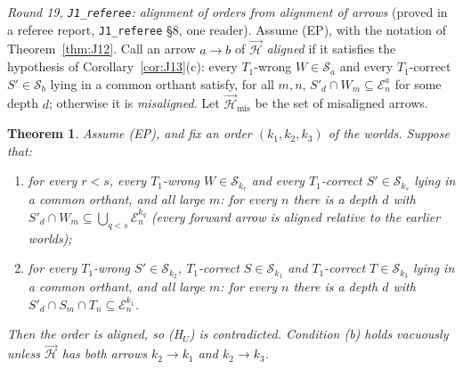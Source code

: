 \documentclass[11pt]{article}
\newtheorem{theorem}{Theorem}[section]
\theoremstyle{definition}
\theoremstyle{remark}
\newcommand{\src}[1]{\texttt{#1}}
\begin{document}
\emph{Round 19, \src{J1\_referee}: alignment of orders from alignment of arrows} (proved in a referee report, \src{J1\_referee} \S8, one reader). Assume (EP), with the notation of Theorem~\ref{thm:J12}. Call an arrow $a\to b$ of $\vec{\mathcal H}$ \emph{aligned} if it satisfies the hypothesis of Corollary~\ref{cor:J13}(c): every $T_1$-wrong $W\in\mathcal S_a$ and every $T_1$-correct $S'\in\mathcal S_b$ lying in a common orthant satisfy, for all $m,n$, $S'_d\cap W_m\subseteq\mathcal E^a_n$ for some depth $d$; otherwise it is \emph{misaligned}. Let $\vec{\mathcal H}_{\mathrm{mis}}$ be the set of misaligned arrows.

\begin{theorem}\label{thm:JR2}
Assume (EP), and fix an order $(k_1,k_2,k_3)$ of the worlds. Suppose that:
\begin{enumerate}[leftmargin=*,label=(\alph*)]
\item for every $r<s$, every $T_1$-wrong $W\in\mathcal S_{k_r}$ and every $T_1$-correct $S'\in\mathcal S_{k_s}$ lying in a common orthant, and all large $m$: for every $n$ there is a depth $d$ with $S'_d\cap W_m\subseteq\bigcup_{q<s}\mathcal E^{k_q}_n$ (every forward arrow is aligned relative to the earlier worlds);
\item for every $T_1$-wrong $S'\in\mathcal S_{k_2}$, $T_1$-correct $S\in\mathcal S_{k_1}$ and $T_1$-correct $T\in\mathcal S_{k_3}$ lying in a common orthant, and all large $m$: for every $n$ there is a depth $d$ with $S'_d\cap S_m\cap T_n\subseteq\mathcal E^{k_1}_n$.
\end{enumerate}
Then the order is aligned, so (H$_U$) is contradicted. Condition (b) holds vacuously unless $\vec{\mathcal H}$ has both arrows $k_2\to k_1$ and $k_2\to k_3$.
\end{theorem}
\end{document}
